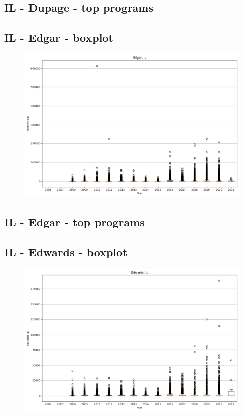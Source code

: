 \subsection*{IL - Dupage - top programs}

\newpage
\subsection*{IL - Edgar - boxplot}
\begin{figure}[h]
\centering
\includegraphics[width=7in]{../output/boxplots/counties/Edgar-IL_boxplot.png}
\end{figure}


\subsection*{IL - Edgar - top programs}

\newpage
\subsection*{IL - Edwards - boxplot}
\begin{figure}[h]
\centering
\includegraphics[width=7in]{../output/boxplots/counties/Edwards-IL_boxplot.png}
\end{figure}


